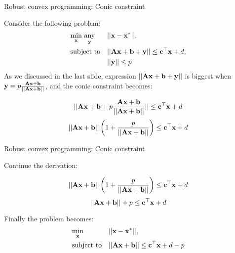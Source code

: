 \documentclass{beamer}
\begin{document}
\begin{frame}{Robust convex programming: Conic constraint}
	\begin{flushleft}
		
		Consider the following problem:
		\begin{equation}
			\begin{aligned}
				& \underset{\bo{x}}{\text{min}} \ \underset{\bo{y}}{\text{any}}
				& & ||\bo{x} - \bo{x}^*||, \\
				& \text{subject to}
				& & || \bo{A}\bo{x} + \bo{b} + \bo{y} || \leq \bo{c}^\top \bo{x} + d, \\
				& & & ||\bo{y}|| \leq p
			\end{aligned}
		\end{equation}
		As we discussed in the last slide, expression $|| \mathbf{A}\mathbf{x} + \mathbf{b} + \mathbf{y} ||$ is biggest when $\mathbf{y} = p \frac{\mathbf{A}\mathbf{x} + \mathbf{b}}{|| \mathbf{A}\mathbf{x} + \mathbf{b} ||}$, and the conic constraint becomes:
		
		\begin{equation}
			|| \mathbf{A}\mathbf{x} + \mathbf{b} + p \frac{\mathbf{A}\mathbf{x} + \mathbf{b}}{|| \mathbf{A}\mathbf{x} + \mathbf{b} ||} || \leq \mathbf{c}^\top \mathbf{x} + d
		\end{equation}
		\begin{equation}
		|| \mathbf{A}\mathbf{x} + \mathbf{b}|| \left( 1 + \frac{p}{|| \mathbf{A}\mathbf{x} + \mathbf{b}||} \right) \leq \mathbf{c}^\top \mathbf{x} + d
		\end{equation}
		
		
	\end{flushleft}
\end{frame}




\begin{frame}{Robust convex programming: Conic constraint}
	\begin{flushleft}
		
		Continue the derivation:
		
		\begin{equation}
			|| \mathbf{A}\mathbf{x} + \mathbf{b}|| \left( 1 + \frac{p}{|| \mathbf{A}\mathbf{x} + \mathbf{b}||} \right) \leq \mathbf{c}^\top \mathbf{x} + d
		\end{equation}
		\begin{equation}
			|| \mathbf{A}\mathbf{x} + \mathbf{b}|| + p \leq \mathbf{c}^\top \mathbf{x} + d
		\end{equation}
		
		Finally the problem becomes:
		\begin{equation}
			\begin{aligned}
				& \underset{\mathbf{x}}{\text{min}}
				& & ||\mathbf{x} - \mathbf{x}^*||, \\
				& \text{subject to}
				& & || \mathbf{A}\mathbf{x} + \mathbf{b}|| \leq \mathbf{c}^\top \mathbf{x} + d - p
			\end{aligned}
		\end{equation}
		
	\end{flushleft}
\end{frame}


\myqrframe
\end{document}
